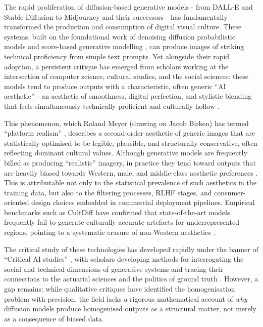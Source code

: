 \documentclass[11pt]{article}
\begin{document}
The rapid proliferation of diffusion-based generative models - from DALL-E \citep{Ramesh2021} and Stable Diffusion \citep{Rombach2022} to Midjourney and their successors - has fundamentally transformed the production and consumption of digital visual culture. These systems, built on the foundational work of denoising diffusion probabilistic models \citep{Ho2020, Sohl-Dickstein2015} and score-based generative modelling \citep{Song2019, Song2021}, can produce images of striking technical proficiency from simple text prompts. Yet alongside their rapid adoption, a persistent critique has emerged from scholars working at the intersection of computer science, cultural studies, and the social sciences: these models tend to produce outputs with a characteristic, often generic ``AI aesthetic'' - an aesthetic of smoothness, digital perfection, and stylistic blending that feels simultaneously technically proficient and culturally hollow \citep{Lindgren2024, RaleyRhee2023, RobergeCastelle2021, OffertDhaliwal2025}.

This phenomenon, which Roland Meyer (drawing on Jacob Birken) has termed ``platform realism'' \citep{Meyer2025}, describes a second-order aesthetic of generic images that are statistically optimised to be legible, plausible, and structurally conservative, often reflecting dominant cultural values. Although generative models are frequently billed as producing ``realistic'' imagery, in practice they tend toward outputs that are heavily biased towards Western, male, and middle-class aesthetic preferences \citep{Meyer2025, Bianchi2023, Luccioni2023}. This is attributable not only to the statistical prevalence of such aesthetics in the training data, but also to the filtering processes, RLHF stages, and consumer-oriented design choices embedded in commercial deployment pipelines. Empirical benchmarks such as CultDiff have confirmed that state-of-the-art models frequently fail to generate culturally accurate artefacts for underrepresented regions, pointing to a systematic erasure of non-Western aesthetics \citep{Bayramli2025}.

The critical study of these technologies has developed rapidly under the banner of ``Critical AI studies'' \citep{Lindgren2024, RaleyRhee2023, RobergeCastelle2021}, with scholars developing methods for interrogating the social and technical dimensions of generative systems \citep{OffertDhaliwal2025, OffertPhan2024} and tracing their connections to the actuarial sciences and the politics of ground truth \citep{Amoore2023, Kang2023, Sadowski2025}. However, a gap remains: while qualitative critiques have identified the homogenisation problem with precision, the field lacks a rigorous mathematical account of \textit{why} diffusion models produce homogenised outputs as a structural matter, not merely as a consequence of biased data.
\end{document}
